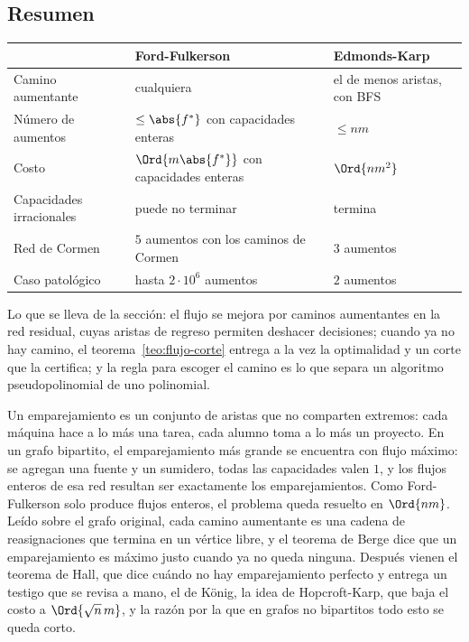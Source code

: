 \documentclass[11pt,letterpaper]{article}
\begin{document}

\subsection*{Resumen}

\begin{center}
\small
\begin{tabular}{lll}
  \toprule
  & \textbf{Ford-Fulkerson} & \textbf{Edmonds-Karp} \\
  \midrule
  Camino aumentante & cualquiera & el de menos aristas, con BFS \\
  Número de aumentos & $\le \abs{f^*}$ con capacidades enteras
    & $\le nm$ \\
  Costo & $\Ord{m \abs{f^*}}$ con capacidades enteras
    & $\Ord{n m^2}$ \\
  Capacidades irracionales & puede no terminar & termina \\
  Red de Cormen & $5$ aumentos con los caminos de Cormen
    & $3$ aumentos \\
  Caso patológico & hasta $2 \cdot 10^6$ aumentos & $2$ aumentos \\
  \bottomrule
\end{tabular}
\end{center}

Lo que se lleva de la sección: el flujo se mejora por caminos
aumentantes en la red residual, cuyas aristas de regreso permiten
deshacer decisiones; cuando ya no hay camino, el
teorema~\ref{teo:flujo-corte} entrega a la vez la optimalidad y un
corte que la certifica; y la regla para escoger el camino es lo que
separa un algoritmo pseudopolinomial de uno polinomial.

\newpage


\label{sec:emparejamiento}

\begin{quick_sum}
  Un emparejamiento es un conjunto de aristas que no comparten
  extremos: cada máquina hace a lo más una tarea, cada alumno toma a
  lo más un proyecto. En un grafo bipartito, el emparejamiento más
  grande se encuentra con flujo máximo: se agregan una fuente y un
  sumidero, todas las capacidades valen $1$, y los flujos enteros de
  esa red resultan ser exactamente los emparejamientos. Como
  Ford-Fulkerson solo produce flujos enteros, el problema queda
  resuelto en $\Ord{nm}$. Leído sobre el grafo original, cada camino
  aumentante es una cadena de reasignaciones que termina en un
  vértice libre, y el teorema de Berge dice que un emparejamiento es
  máximo justo cuando ya no queda ninguna. Después vienen el teorema
  de Hall, que dice cuándo no hay emparejamiento perfecto y entrega
  un testigo que se revisa a mano, el de König, la idea de
  Hopcroft-Karp, que baja el costo a $\Ord{\sqrt{n}\, m}$, y la razón
  por la que en grafos no bipartitos todo esto se queda corto.
\end{quick_sum}
\end{document}
